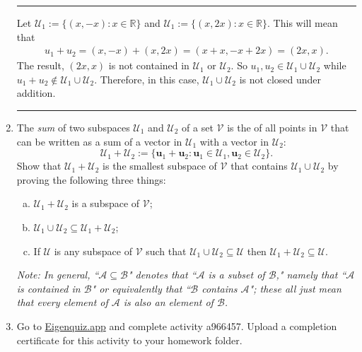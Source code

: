 \documentclass[12pt]{amsart}
\newcommand{\1}{\mathbbm{1}}
\numberwithin{equation}{section}
\numberwithin{Theorem}{section}
\theoremstyle{plain} %
\theoremstyle{definition}
\theoremstyle{remark}
\begin{document}
\begin{enumerate}[1.]
\hrule\bigskip
Let $\mathcal{U}_1 := \{(x,-x):x\in\mathbb{R}\}$ and $\mathcal{U}_1 := \{(x,2x):x\in\mathbb{R}\}$.
This will mean that
\begin{align*}
	u_1 + u_2 = (x,-x)+(x,2x) = (x+x,-x+2x) = (2x,x).
\end{align*}
The result, $(2x,x)$ is not contained in $\mathcal{U}_1$ or $\mathcal{U}_2$.
So $u_1, u_2 \in \mathcal{U}_1\cup\mathcal{U}_2$ while $u_1+ u_2 \notin \mathcal{U}_1\cup\mathcal{U}_2$. Therefore, in this case, $\mathcal{U}_1\cup\mathcal{U}_2$ is not closed under addition.
\bigskip\hrule\bigskip
\item
The \textit{sum} of two subspaces $\mathcal{U}_1$ and $\mathcal{U}_2$ of a set $\mathcal{V}$ is the of all points in $\mathcal{V}$ that can be written as a sum of a vector in $\mathcal{U}_1$ with a vector in $\mathcal{U}_2$:
\begin{equation*}
\mathcal{U}_1+\mathcal{U}_2:=\{\mathbf{u}_1+\mathbf{u}_2: \mathbf{u}_1\in\mathcal{U}_1,\mathbf{u}_2\in\mathcal{U}_2\}.
\end{equation*}
Show that $\mathcal{U}_1+\mathcal{U}_2$ is the smallest subspace of $\mathcal{V}$ that contains $\mathcal{U}_1\cup\mathcal{U}_2$ by proving the following three things:
\begin{enumerate}[(a)]
\item
$\mathcal{U}_1+\mathcal{U}_2$ is a subspace of $\mathcal{V}$;
\item
$\mathcal{U}_1\cup\mathcal{U}_2\subseteq\mathcal{U}_1+\mathcal{U}_2$;
\item
If $\mathcal{U}$ is any subspace of $\mathcal{V}$ such that $\mathcal{U}_1\cup\mathcal{U}_2\subseteq\mathcal{U}$ then $\mathcal{U}_1+\mathcal{U}_2\subseteq\mathcal{U}$.
\end{enumerate}\bigskip

\textit{Note:
In general, ``$\mathcal{A}\subseteq\mathcal{B}$" denotes that ``$\mathcal{A}$ is a subset of $\mathcal{B}$," namely that ``$\mathcal{A}$ is contained in $\mathcal{B}$" or equivalently that ``$\mathcal{B}$ contains $\mathcal{A}$"; these all just mean that every element of $\mathcal{A}$ is also an element of $\mathcal{B}$.}\bigskip

\item Go to \href{https://eigenquiz.app/}{Eigenquiz.app} and complete activity a966457. Upload a completion certificate for this activity to your homework folder.
\end{enumerate}
\end{document}
